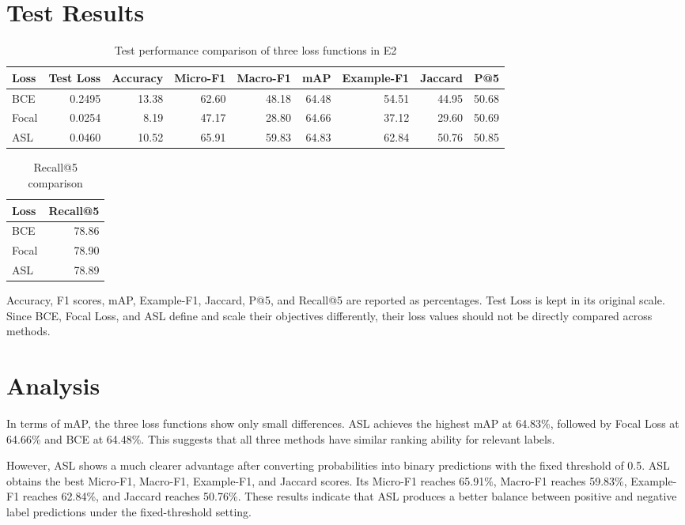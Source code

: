 \documentclass{article}
\begin{document}
\section{Test Results}

\begin{table}[htbp]
\centering
\caption{Test performance comparison of three loss functions in E2}
\label{tab:e2_loss_comparison_en}
\begin{tabular}{lrrrrrrrr}
\toprule
Loss & Test Loss & Accuracy & Micro-F1 & Macro-F1 & mAP & Example-F1 & Jaccard & P@5 \\
\midrule
BCE
& 0.2495 & 13.38 & 62.60 & 48.18 & 64.48 & 54.51 & 44.95 & 50.68 \\
Focal
& 0.0254 & 8.19 & 47.17 & 28.80 & 64.66 & 37.12 & 29.60 & 50.69 \\
ASL
& 0.0460 & 10.52 & 65.91 & 59.83 & 64.83 & 62.84 & 50.76 & 50.85 \\
\bottomrule
\end{tabular}
\end{table}

\begin{table}[htbp]
\centering
\caption{Recall@5 comparison}
\label{tab:e2_recall_at_5_en}
\begin{tabular}{lr}
\toprule
Loss & Recall@5 \\
\midrule
BCE & 78.86 \\
Focal & 78.90 \\
ASL & 78.89 \\
\bottomrule
\end{tabular}
\end{table}

Accuracy, F1 scores, mAP, Example-F1, Jaccard, P@5, and Recall@5 are reported as
percentages. Test Loss is kept in its original scale. Since BCE, Focal Loss, and
ASL define and scale their objectives differently, their loss values should not be
directly compared across methods.

\section{Analysis}

In terms of mAP, the three loss functions show only small differences.
ASL achieves the highest mAP at 64.83\%, followed by Focal Loss at 64.66\% and BCE
at 64.48\%. This suggests that all three methods have similar ranking ability for
relevant labels.

However, ASL shows a much clearer advantage after converting probabilities into
binary predictions with the fixed threshold of 0.5. ASL obtains the best Micro-F1,
Macro-F1, Example-F1, and Jaccard scores. Its Micro-F1 reaches 65.91\%, Macro-F1
reaches 59.83\%, Example-F1 reaches 62.84\%, and Jaccard reaches 50.76\%.
These results indicate that ASL produces a better balance between positive and
negative label predictions under the fixed-threshold setting.
\end{document}
